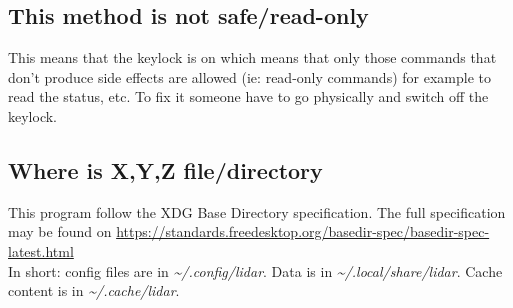 \documentclass[letterpaper, 10 pt]{article}
\begin{document}
\subsection{This method is not safe/read-only}
This means that the keylock is on which means that only those commands that don't produce side effects are allowed (ie: read-only commands) for example to read the status, etc. To fix it someone have to go physically and switch off the keylock.
\subsection{Where is X,Y,Z file/directory}
This program follow the XDG Base Directory specification. The full specification may be found on \url{https://standards.freedesktop.org/basedir-spec/basedir-spec-latest.html}\\
\linebreak
In short: config files are in \textit{ \~{}/.config/lidar}. Data is in \textit{\~{}/.local/share/lidar}. Cache content is in \textit{\~{}/.cache/lidar}.

\newpage

%
\end{document}
